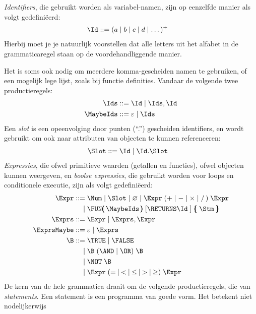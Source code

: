 \emph{Identifiers}, die gebruikt worden als variabel-namen,%
zijn op eenzelfde manier als volgt gedefiniëerd:
\begin{align*}
  \Id \GrammarDef (a \mid b \mid c \mid d \mid \dots)^+
\end{align*}
Hierbij moet je je natuurlijk%
voorstellen dat alle letters uit het alfabet in de grammaticaregel staan op de voordehandliggende%
manier.

Het is soms ook nodig om meerdere komma-gescheiden namen te gebruiken, of een mogelijk lege lijst, zoals bij functie definities. Vandaar de volgende twee productieregels:
\begin{align*}
  \Ids \GrammarDef \Id \mid \Ids, \Id \\
  \MaybeIds \GrammarDef \varepsilon \mid \Ids
\end{align*}
Een \emph{slot}%
is een opeenvolging door punten (``.'') gescheiden identifiers,%
en wordt gebruikt om ook naar attributen van objecten te kunnen referenceren:%
\begin{align*}
  \Slot \GrammarDef \Id \mid \Id . \Slot
\end{align*}
\emph{Expressies}, die ofwel primitieve waarden (getallen en functies), ofwel objecten kunnen weergeven, en \emph{boolse expressies}, die gebruikt worden voor loops en conditionele executie, zijn als volgt gedefiniëerd:%
\begin{align*}
  \Expr \GrammarDef \Num \mid \Slot \mid \varnothing \mid \Expr\; (+ \mid - \mid \times \mid /\,)\; \Expr \\
  \GrammarOr \FUN\pmb{(}\,\MaybeIds\,\pmb{)}\; \GrammarOpt{\RETURNS \Id\;} \pmb{\{}\; \Stm\; \pmb{\}} \\
  \Exprs \GrammarDef \Expr \mid \Exprs, \Expr \\
  \ExprsMaybe \GrammarDef \varepsilon \mid \Exprs \\
  \B \GrammarDef \TRUE \mid \FALSE \\
  \GrammarOr \B\; (\AND \mid \OR)\; \B \\
  \GrammarOr \NOT\; \B \\
  \GrammarOr \Expr\; (=\: \mid\: <\: \mid\: \le\: \mid\: >\: \mid\: \ge)\; \Expr
\end{align*}
De kern van de hele grammatica draait om de volgende productieregels, die van \emph{statements}. Een statement is een programma van goede vorm. Het betekent niet nodelijkerwijs%
